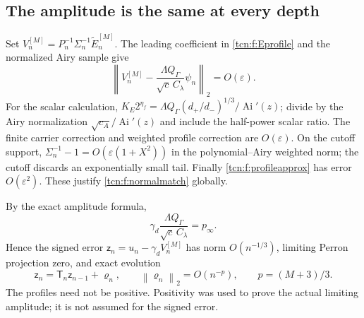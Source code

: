 \documentclass[11pt,letterpaper]{article}
\newcommand{\Ai}{\operatorname{Ai}}
\newcommand{\norm}[1]{\left\lVert#1\right\rVert}
\newcommand{\eps}{\varepsilon}
\theoremstyle{remark}
\begin{document}
\subsection{The amplitude is the same at every depth}
Set $V_n^{[M]}=P_n^{-1}\Sigma_n^{-1}\widetilde E_n^{[M]}$. The leading coefficient in \eqref{tcn:f:Eprofile} and the normalized Airy sample give
\begin{equation}\label{tcn:f:normalmatch}
 \norm{V_n^{[M]}-\frac{\Lambda Q_\Gamma}{\sqrt c\,C_\lambda}\psi_n}_2
 =O(\eps).
\end{equation}
For the scalar calculation, $K_E2^{\eta_f}=\Lambda Q_\Gamma(d_+/d_-)^{1/3}/\Ai'(z)$; divide by the Airy normalization $\sqrt{c_A}/\Ai'(z)$ and include the half-power scalar ratio. The finite carrier correction and weighted profile correction are $O(\eps)$. On the cutoff support, $\Sigma_n^{-1}-1=O(\eps(1+X^2))$ in the polynomial--Airy weighted norm; the cutoff discards an exponentially small tail. Finally \eqref{tcn:f:profileapprox} has error $O(\eps^2)$. These justify \eqref{tcn:f:normalmatch} globally.

By the exact amplitude formula,
\[
 \gamma_d\frac{\Lambda Q_\Gamma}{\sqrt c\,C_\lambda}=p_\infty.
\]
Hence the signed error $\mathsf z_n=u_n-\gamma_dV_n^{[M]}$ has norm $O(n^{-1/3})$, limiting Perron projection zero, and exact evolution
\begin{equation}\label{tcn:f:forced}
 \mathsf z_n=\mathsf T_n\mathsf z_{n-1}+\varrho_n,\qquad
 \norm{\varrho_n}_2=O(n^{-p}),\qquad p=(M+3)/3.
\end{equation}
The profiles need not be positive. Positivity was used to prove the actual limiting amplitude; it is not assumed for the signed error.
\end{document}
